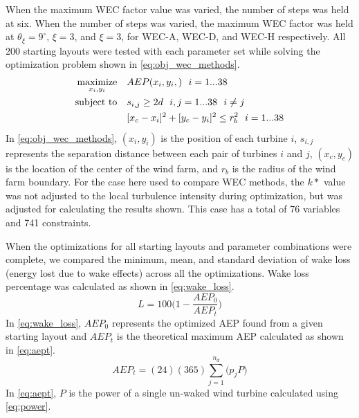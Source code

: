 \documentclass[a4paper]{jpconf}
\begin{document}
When the maximum WEC factor value was varied, the number of steps was held at six. When the number of steps was varied, the maximum WEC factor was held at $\theta_\xi = 9 ^\circ$, $\xi=3$, and $\xi=3$, for WEC-A, WEC-D, and WEC-H respectively. All 200 starting layouts were tested with each parameter set while solving the optimization problem shown in \cref{eq:obj_wec_methods}. 
%
\begin{equation}
\label{eq:obj_wec_methods}
\begin{aligned} [b]
\underset{x_i,y_i}{\textrm{maximize}} \quad & AEP(x_i,y_i,)~~i=1...38\\
\textrm{subject to} \quad & s_{i,j} \geq 2\*d~~i,j=1...38~~i \neq j\\
& [x_c-x_i]^2+[y_c-y_i]^2 \leq r_{b}^2~~i=1...38
\end{aligned}
\end{equation}
%
In \cref{eq:obj_wec_methods}, $(x_i,y_i)$ is the position of each turbine $i$, $s_{i,j}$ represents the separation distance between each pair of turbines $i$ and $j$, $(x_c,y_c)$ is the location of the center of the wind farm, and $r_b$ is the radius of the wind farm boundary. For the case here used to compare WEC methods, the $k*$ value was not adjusted to the local turbulence intensity during optimization, but was adjusted for calculating the results shown. This case has a total of 76 variables and 741 constraints.

When the optimizations for all starting layouts and parameter combinations were complete, we compared the minimum, mean, and standard deviation of wake loss (energy lost due to wake effects) across all the optimizations. Wake loss percentage was calculated as shown in \cref{eq:wake_loss}.
%
\begin{equation} \label{eq:wake_loss}
	L = 100 \bigg( 1 - \frac{AEP_0}{AEP_t} \bigg)
\end{equation}
%
 In \cref{eq:wake_loss}, $AEP_0$ represents the optimized AEP found from a given starting layout and $AEP_t$ is the theoretical maximum AEP calculated as shown in \cref{eq:aept}. 
 \begin{equation} \label{eq:aept}
 AEP_t = (24)(365)\sum_{j=1}^{n_d} \bigg( p_j P \bigg)  
 \end{equation}
 In \cref{eq:aept}, $P$ is the power of a single un-waked wind turbine calculated using \cref{eq:power}. 
 
\end{document}
